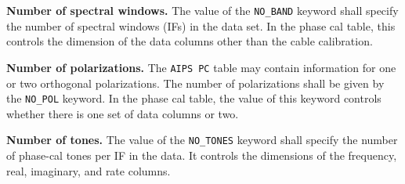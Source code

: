 \documentclass[twoside]{article}
\begin{document}
{\bf Number of spectral windows.} The value of the {\tt NO\_BAND}
keyword shall specify the number of spectral windows (IFs) in the data
set.  In the phase cal table, this controls the dimension of the
data columns other than the cable calibration.

{\bf Number of polarizations.}  The {\tt AIPS PC} table may contain
information for one or two orthogonal polarizations.  The number of
polarizations shall be given by the {\tt NO\_POL} keyword.   In the
phase cal table, the value of this keyword controls whether there is
one set of data columns or two.

{\bf Number of tones.} The value of the {\tt NO\_TONES} keyword shall
specify the number of phase-cal tones per IF in the data.  It controls
the dimensions of the frequency, real, imaginary, and rate columns.
\vfill\eject
\end{document}
